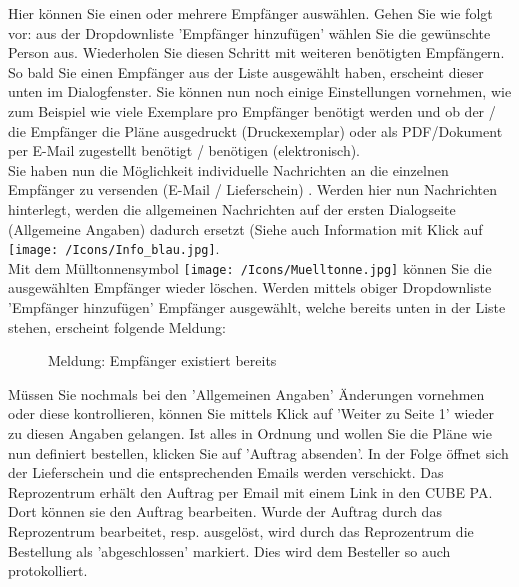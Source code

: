 Hier können Sie einen oder mehrere Empfänger auswählen. Gehen Sie wie folgt vor: aus der Dropdownliste 'Empfänger hinzufügen' wählen Sie die gewünschte Person aus. Wiederholen Sie diesen Schritt mit weiteren benötigten Empfängern. So bald Sie einen Empfänger aus der Liste ausgewählt haben, erscheint dieser unten im Dialogfenster. Sie können nun noch einige Einstellungen vornehmen, wie zum Beispiel wie viele Exemplare pro Empfänger benötigt werden und ob der / die Empfänger die Pläne ausgedruckt (Druckexemplar) oder als PDF/Dokument per E-Mail zugestellt benötigt / benötigen (elektronisch). \\
Sie haben nun die Möglichkeit individuelle Nachrichten an die einzelnen Empfänger zu versenden (E-Mail / Lieferschein) . Werden hier nun Nachrichten hinterlegt, werden die allgemeinen Nachrichten auf der ersten Dialogseite (Allgemeine Angaben) dadurch ersetzt (Siehe auch Information mit Klick auf \texttt{[image: /Icons/Info\_blau.jpg]}. \\
Mit dem Mülltonnensymbol \texttt{[image: /Icons/Muelltonne.jpg]}  können Sie die ausgewählten Empfänger wieder löschen. Werden mittels obiger Dropdownliste 'Empfänger hinzufügen'  Empfänger ausgewählt, welche bereits unten in der Liste stehen, erscheint folgende Meldung:

\begin{figure}[H]
\caption{Meldung: Empfänger existiert bereits}
\end{figure}

Müssen Sie nochmals bei den 'Allgemeinen Angaben' Änderungen vornehmen oder diese kontrollieren, können Sie mittels Klick auf 'Weiter zu Seite 1' wieder zu diesen Angaben gelangen. Ist alles in Ordnung und wollen Sie die Pläne wie nun definiert bestellen, klicken Sie auf 'Auftrag absenden'. In der Folge öffnet sich der Lieferschein und die entsprechenden Emails werden verschickt. Das Reprozentrum erhält den Auftrag per Email mit einem Link in den CUBE PA. Dort können sie den Auftrag bearbeiten. Wurde der Auftrag durch das Reprozentrum bearbeitet, resp. ausgelöst, wird durch das Reprozentrum die Bestellung als 'abgeschlossen' markiert. Dies wird dem Besteller so auch protokolliert.

